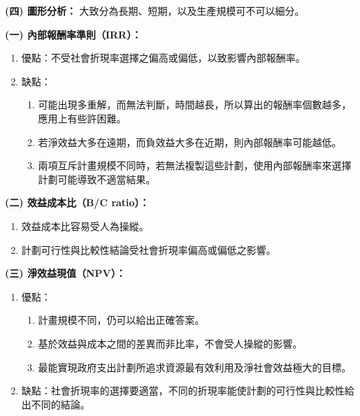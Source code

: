 \documentclass[12pt, a4paper]{article}
\begin{document}
\noindent\textbf{(四) 圖形分析：}
大致分為長期、短期，以及生產規模可不可以細分。

\newpage

\vspace{0.5em} %

\noindent\textbf{(一) 內部報酬率準則（IRR）：}
\begin{enumerate}[label=\textbf{\arabic*.}, itemsep=0.5em, topsep=0.3em]
    \item 優點：不受社會折現率選擇之偏高或偏低，以致影響內部報酬率。
    \item 缺點：
    \begin{enumerate}[label=\arabic*.]
        \item 可能出現多重解，而無法判斷，時間越長，所以算出的報酬率個數越多，應用上有些許困難。
        \item 若淨效益大多在遠期，而負效益大多在近期，則內部報酬率可能越低。
        \item 兩項互斥計畫規模不同時，若無法複製這些計劃，使用內部報酬率來選擇計劃可能導致不適當結果。
    \end{enumerate}
\end{enumerate}

\noindent\textbf{(二) 效益成本比（B/C ratio）：}
\begin{enumerate}[label=\textbf{\arabic*.}, itemsep=0.5em, topsep=0.3em]
    \item 效益成本比容易受人為操縱。
    \item 計劃可行性與比較性結論受社會折現率偏高或偏低之影響。
\end{enumerate}

\noindent\textbf{(三) 淨效益現值（NPV）：}
\begin{enumerate}[label=\textbf{\arabic*.}, itemsep=0.5em, topsep=0.3em]
    \item 優點：
    \begin{enumerate}[label=\arabic*.]
        \item 計畫規模不同，仍可以給出正確答案。
        \item 基於效益與成本之間的差異而非比率，不會受人操縱的影響。
        \item 最能實現政府支出計劃所追求資源最有效利用及淨社會效益極大的目標。
    \end{enumerate}
    \item 缺點：社會折現率的選擇要適當，不同的折現率能使計劃的可行性與比較性給出不同的結論。
\end{enumerate}
\end{document}

